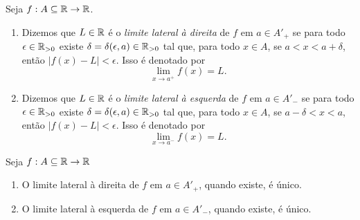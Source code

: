 \begin{definition}
    Seja $f : A \subseteq \mathbb{R} \to \mathbb{R}$.
        \begin{enumerate}[leftmargin=*, align=left, label=\textbf{(\alph*)}]
            \item Dizemos que $L \in \mathbb{R}$ é o \emph{limite lateral à direita} de $f$ em $a \in A'_+$ se para todo $\epsilon \in \mathbb{R}_{>0}$ existe $\delta = \delta(\epsilon, a) \in \mathbb{R}_{>0}$ tal que, para todo $x \in A$, se $a < x < a + \delta$, então $|f(x)-L| < \epsilon$. Isso é denotado por
                \[
                    \lim_{x \to a^+} f(x) = L.
                \]
            \item Dizemos que $L \in \mathbb{R}$ é o \emph{limite lateral à esquerda} de $f$ em $a \in A'_-$ se para todo $\epsilon \in \mathbb{R}_{>0}$ existe $\delta = \delta(\epsilon, a) \in \mathbb{R}_{>0}$ tal que, para todo $x \in A$, se $a - \delta < x < a$, então $|f(x)-L| < \epsilon$. Isso é denotado por
                \[
                    \lim_{x \to a^-} f(x) = L.
                \]
        \end{enumerate}
\end{definition}

\begin{proposition}[Unicidade] \label{prop.calc1:unicidade_limites_laterais}
    Seja $f : A \subseteq \mathbb{R} \to \mathbb{R}$
        \begin{enumerate}[leftmargin=*, align=left, label=\textbf{(\alph*)}]
            \item O limite lateral à direita de $f$ em $a \in A'_+$, quando existe, é único.
            \item O limite lateral à esquerda de $f$ em $a \in A'_-$, quando existe, é único.
        \end{enumerate}
\end{proposition}

